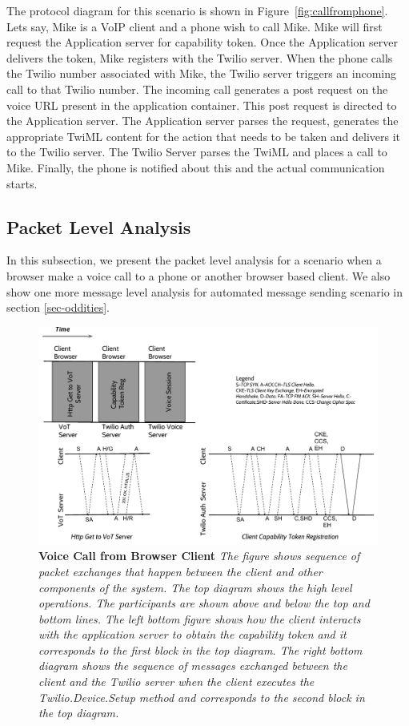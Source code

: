 The protocol diagram for this scenario is shown in Figure~\ref{fig:callfromphone}. Lets say, Mike is a VoIP client and a phone wish to call Mike. Mike will first request the Application server for capability token. Once the Application server delivers the token, Mike registers with the Twilio server. When the phone calls the Twilio number associated with Mike, the Twilio server triggers an incoming call to that Twilio number. The incoming call generates a post request on the voice URL present in the application container. This post request is directed to the Application server. The Application server parses the request, generates the appropriate TwiML content for the action that needs to be taken and delivers it to the Twilio server. The Twilio Server parses the TwiML and places a call to Mike. Finally, the phone is notified about this and the actual communication starts.

\subsection{Packet Level Analysis}
In this subsection, we present the packet level analysis for a scenario when a browser make a voice call to a phone or another browser based client. We also show one more message level analysis for automated message sending scenario in section \ref{sec-oddities}. 

\begin{figure}[t!] \centering
\includegraphics[width=\textwidth]{figs/voicecallpacketlevel.pdf}
\caption{\textbf{Voice Call from Browser Client} {\footnotesize\textit{
The figure shows sequence of packet exchanges that happen between the client and other components of the system. The top diagram shows the high level operations. The participants are shown above and below the top and bottom lines. The left bottom figure shows how the client interacts with the application server to obtain the \textit{capability token} and it corresponds to the first block in the top diagram. The right bottom diagram shows the sequence of messages exchanged between the client and the \textit{Twilio} server when the client executes the \textit{Twilio.Device.Setup} method and corresponds to the second block in the top diagram.  
}}}
\label{fig:messagelevel}
\end{figure}

